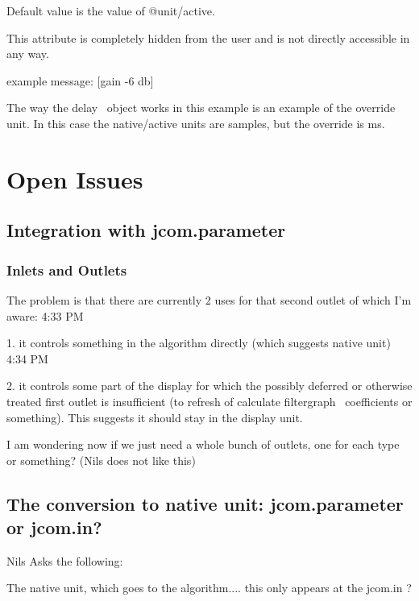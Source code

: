\documentclass[]{article}
\begin{document}
Default value is the value of @unit/active.

This attribute is completely hidden from the user and is not directly accessible in any way.

example message:     [gain -6 db]

The way the delay~ object works in this example is an example of the override unit.  In this case the native/active units are samples, but the override is ms.






\section{Open Issues}

\subsection{Integration with jcom.parameter}

\subsubsection{Inlets and Outlets}

The problem is that there are currently 2 uses for that second outlet of which I'm aware:
4:33 PM
 
1. it controls something in the algorithm directly (which suggests native unit)
4:34 PM
 
2. it controls some part of the display for which the possibly deferred or otherwise treated first outlet is insufficient (to refresh of calculate filtergraph~ coefficients or something).  This suggests it should stay in the display unit.


 I am wondering now if we just need a whole bunch of outlets, one for each type or something?  (Nils does not like this)




\subsection{The conversion to native unit: jcom.parameter or jcom.in?}

Nils Asks the following:

The native unit, which goes to the algorithm....  this only appears at the jcom.in ?
\end{document}
